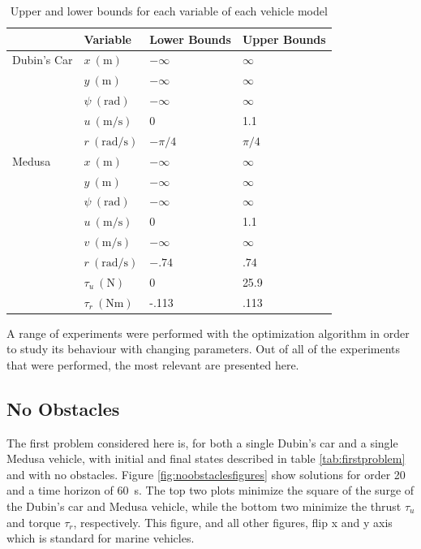 \begin{table}[h!]
\centering
\begin{tabular}{|l|l|l|l|}
\hline
& Variable & Lower Bounds & Upper Bounds \\ \hline
Dubin's Car & $x\ (\si{\meter})$ & $-\infty$ & $\infty$ \\
& $y\ (\si{\meter})$ & $-\infty$ & $\infty$ \\
& $\psi\ (\si{\radian})$ & $-\infty$ & $\infty$ \\
& $u\ (\si{\meter\per\second})$ & 0 & 1.1 \\
& $r\ (\si{\radian\per\second})$ & $-\pi/4$ & $\pi/4$ \\ \hline
Medusa & $x\ (\si{\meter})$ & $-\infty$ & $\infty$ \\
& $y\ (\si{\meter})$ & $-\infty$ & $\infty$ \\
& $\psi\ (\si{\radian})$ & $-\infty$ & $\infty$ \\
& $u\ (\si{\meter\per\second})$ & 0 & 1.1 \\
& $v\ (\si{\meter\per\second})$ & $-\infty$ & $\infty$ \\
& $r\ (\si{\radian\per\second})$ & $-.74$ & $.74$ \\
& $\tau_u\ (\si{\newton})$ & 0 & 25.9 \\
& $\tau_r\ (\si{\newton\meter})$ & -.113 & .113 \\
\hline
\end{tabular}
\caption{Upper and lower bounds for each variable of each vehicle model}
\label{tab:variablebounds}
\end{table}

\par A range of experiments were performed with the optimization algorithm in order to study its behaviour with changing parameters. Out of all of the experiments that were performed, the most relevant are presented here.


\subsection{No Obstacles}

\par The first problem considered here is, for both a single Dubin's car and a single Medusa vehicle, with initial and final states described in table \ref{tab:firstproblem} and with no obstacles. Figure \ref{fig:noobstaclesfigures} show solutions for order 20 and a time horizon of \SI{60}{\second}. The top two plots minimize the square of the surge of the Dubin's car and Medusa vehicle, while the bottom two minimize the thrust $\tau_u$ and torque $\tau_r$, respectively. This figure, and all other figures, flip x and y axis which is standard for marine vehicles.


